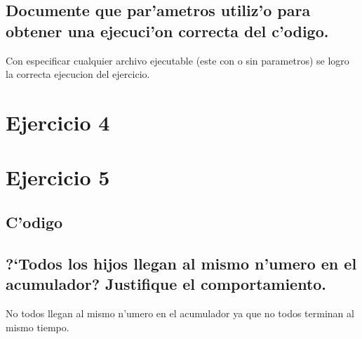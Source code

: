 \documentclass[a4paper,10pt]{article}
\newcommand{\?}{?`}
\begin{document}
\subsection[Punto D]{Documente que par'ametros utiliz'o para obtener una ejecuci'on correcta del c'odigo.}
Con especificar cualquier archivo ejecutable (este con o sin parametros) se logro la correcta ejecucion del ejercicio.

\section{Ejercicio 4}


\section{Ejercicio 5}
\subsection{C'odigo}


\subsection[Punto A]{\?Todos los hijos llegan al mismo n'umero en el acumulador? Justifique el comportamiento.}
No todos llegan al mismo n'umero en el acumulador ya que no todos terminan al mismo tiempo.
\end{document}
